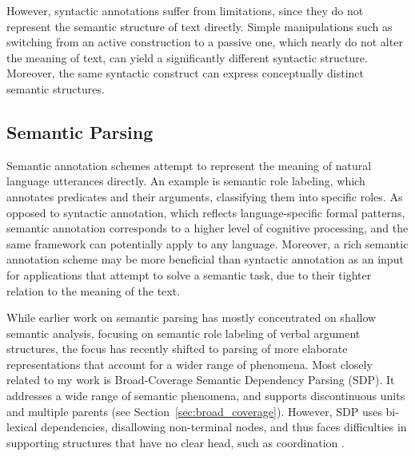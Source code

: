 \documentclass[11pt]{article}
\newcommand{\secref}[1]{Section~\ref{#1}}
\begin{document}
However, syntactic annotations suffer from limitations, since they do not
represent the semantic structure of text directly. Simple manipulations such as
switching from an active construction to a passive one, which nearly do not
alter the meaning of text, can yield a significantly different syntactic
structure. Moreover, the same syntactic construct can express conceptually
distinct semantic structures\cite{abend2013ucca}.


\subsection{Semantic Parsing}

Semantic annotation schemes attempt to represent the meaning of natural
language utterances directly. An example is semantic role
labeling\cite{baker1998framenet}\cite{paass2014semantic}, which annotates
predicates and their arguments, classifying them into specific roles. As
opposed to syntactic annotation, which reflects language-specific formal
patterns, semantic annotation corresponds to a higher level of cognitive
processing, and the same framework can potentially apply to any language.
Moreover, a rich semantic annotation scheme may be more beneficial than
syntactic annotation as an input for applications that attempt to solve a
semantic task, due to their tighter relation to the meaning of the text.

While earlier work on semantic parsing has mostly concentrated on shallow semantic analysis,
focusing on semantic role labeling of verbal argument structures,
the focus has recently shifted to parsing of more elaborate representations that account
for a wider range of phenomena. 
Most closely related to my work is Broad-Coverage Semantic Dependency Parsing (SDP).
It addresses a wide range of semantic phenomena,
and supports discontinuous units and multiple parents
(see \secref{sec:broad_coverage}).
However, SDP uses
bi-lexical dependencies, disallowing non-terminal nodes, and thus faces difficulties in supporting
structures that have no clear head, such as coordination \cite{Ivanova2012who}.
\end{document}

